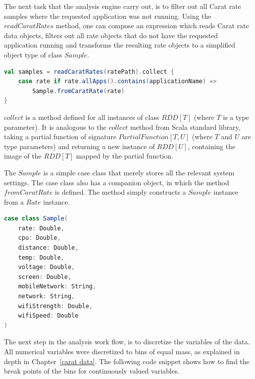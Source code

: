 The next task that the analysis engine carry out, is to filter out all Carat rate samples where the requested application was not running. Using the $readCaratRates$ method, one can compose an expression which reads Carat rate data objects, filters out all rate objects that do not have the requested application running and transforms the resulting rate objects to a simplified object type of class $Sample$. 

\begin{minipage}{0.95\linewidth}
\begin{lstlisting}[language=scala]
val samples = readCaratRates(ratePath).collect {
	case rate if rate.allApps().contains(applicationName) => 
		Sample.fromCaratRate(rate)
}
\end{lstlisting}
\end{minipage}
  
$collect$ is a method defined for all instances of class $RDD[T]$ (where $T$ is a type parameter). It is analogous to the $collect$ method from Scala standard library, taking a partial function of signature $PartialFunction[T, U]$  (where $T$ and $U$ are type parameters) and returning a new instance of $RDD[U]$, containing the image of the $RDD[T]$ mapped by the partial function.
        
The $Sample$ is a simple case class that merely stores all the relevant system settings. The case class also has a companion object, in which the method $fromCaratRate$ is defined. The method simply constructs a $Sample$ instance from a $Rate$ instance. 

\begin{minipage}{0.95\linewidth}
\begin{lstlisting}[language=scala]
case class Sample(
	rate: Double,
	cpu: Double,
	distance: Double,
	temp: Double,
	voltage: Double,
	screen: Double,
	mobileNetwork: String,
	network: String,
	wifiStrength: Double,
	wifiSpeed: Double
)
\end{lstlisting}
\end{minipage}  

The next step in the analysis work flow, is to discretize the variables of the data. All numerical variables were discretized to bins of equal mass, as explained in depth in Chapter~\ref{carat data}. The following code snippet shows how to find the break points of the bins for continuously valued variables.

